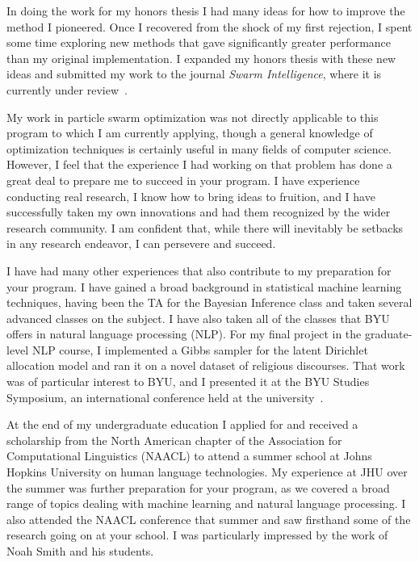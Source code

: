 \documentclass[onecolumn, 12pt]{article}
\begin{document}
In doing the work for my honors thesis I had many ideas for how to improve the
method I pioneered.  Once I recovered from the shock of my first rejection, I
spent some time exploring new methods that gave significantly greater
performance than my original implementation.  I expanded my honors thesis with
these new ideas and submitted my work to the journal \emph{Swarm Intelligence},
where it is currently under
review~\cite{gardner-2010-speculative-approach-to-parallelization-pso}.

My work in particle swarm optimization was not directly applicable to this
program to which I am currently applying, though a general knowledge of
optimization techniques is certainly useful in many fields of computer science.
However, I feel that the experience I had working on that problem has done a
great deal to prepare me to succeed in your program.  I have experience
conducting real research, I know how to bring ideas to fruition, and I have
successfully taken my own innovations and had them recognized by the wider
research community.  I am confident that, while there will inevitably be
setbacks in any research endeavor, I can persevere and succeed.

I have had many other experiences that also contribute to my preparation for
your program.  I have gained a broad background in statistical machine learning
techniques, having been the TA for the Bayesian Inference class and taken
several advanced classes on the subject.  I have also taken all of the classes
that BYU offers in natural language processing (NLP).  For my final project in
the graduate-level NLP course, I implemented a Gibbs sampler for the latent
Dirichlet allocation model and ran it on a novel dataset of religious
discourses.  That work was of particular interest to BYU, and I presented it at
the BYU Studies Symposium, an international conference held at the
university~\cite{gardner-2010-general-conference-topics}.

At the end of my undergraduate education I applied for and received a
scholarship from the North American chapter of the Association for
Computational Linguistics (NAACL) to attend a summer school at Johns Hopkins
University on human language technologies.  My experience at JHU over the
summer was further preparation for your program, as we covered a broad range of
topics dealing with machine learning and natural language processing.  I also
attended the NAACL conference that summer and saw firsthand some of the
research going on at your school.  I was particularly impressed by the work of
Noah Smith and his students.
\end{document}
